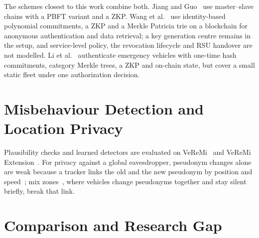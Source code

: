 The schemes closest to this work combine both. Jiang and Guo~\cite{jiang2024trug} use master--slave
chains with a PBFT variant and a ZKP. Wang et al.~\cite{wang2025privacy} use identity-based polynomial
commitments, a ZKP and a Merkle Patricia trie on a blockchain for anonymous authentication and data
retrieval; a key generation centre remains in the setup, and service-level policy, the revocation
lifecycle and RSU handover are not modelled. Li et al.~\cite{li2026emergency} authenticate emergency
vehicles with one-time hash commitments, category Merkle trees, a ZKP and on-chain state, but cover a
small static fleet under one authorization decision.

\section{Misbehaviour Detection and Location Privacy}

Plausibility checks and learned detectors are evaluated on VeReMi~\cite{heijden2018veremi} and
VeReMi Extension~\cite{kamel2020veremiext}. For privacy against a global eavesdropper, pseudonym
changes alone are weak because a tracker links the old and the new pseudonym by position and
speed~\cite{gruteser2005tracking}; mix zones~\cite{beresford2003mix,freudiger2007mix}, where vehicles
change pseudonyms together and stay silent briefly, break that link.

\section{Comparison and Research Gap}

